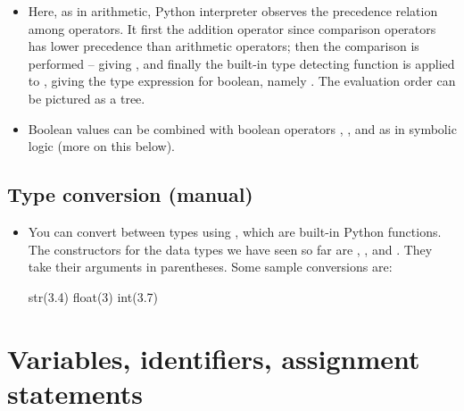 \documentclass[a4paper]{article}
\begin{document}
\begin{itemize}
\item Here, as in arithmetic, Python interpreter observes the precedence
relation among operators. It first  the addition operator since 
comparison operators has lower precedence than arithmetic operators; then the
comparison is performed -- giving , and finally the built-in type
detecting function is applied to , giving the type expression for
boolean, namely . The evaluation order can be pictured as a tree.




\item Boolean values can be combined with boolean operators , ,
and  as in symbolic logic (more on this below).

\end{itemize}

\subsection{Type conversion (manual)}

\begin{itemize}

\item You can convert between types using , which are
built-in Python functions. The constructors for the data types we have seen so
far are , ,  and
. They take their arguments in parentheses. Some sample conversions
are:

\begin{ucodeframe}
\begin{pyconsole}
str(3.4)
float(3)
int(3.7)
\end{pyconsole}
\end{ucodeframe}

\end{itemize}

\section{Variables, identifiers, assignment statements}
\end{document}
